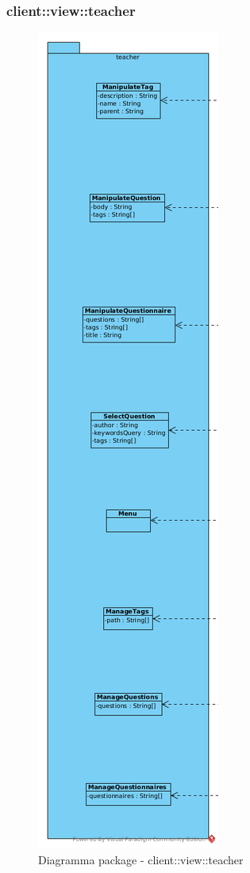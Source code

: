 \subsubsection{client::view::teacher}
\begin{center}
		\begin{figure}[H]
			\centering \includegraphics[scale=4, max width=\textwidth, max height=\myheight]{../img/diagrammiClassi/client/view/teacher.png}
			\caption{Diagramma package - client::view::teacher}
		\end{figure}
	\end{center}\hypertarget{client::view::teacher::ManipulateTag}{}
